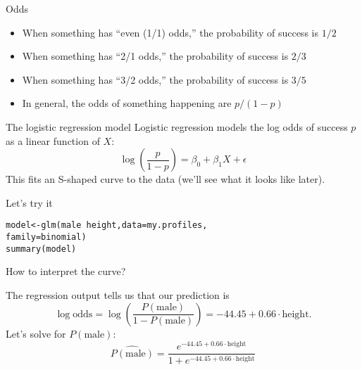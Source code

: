\documentclass{beamer}\usepackage[]{graphicx}\usepackage[]{color}
\makeatletter
\newcommand{\hlopt}[1]{\textcolor[rgb]{1,0.894,0.769}{#1}}%
\newcommand{\hlstd}[1]{\textcolor[rgb]{1,0.894,0.769}{#1}}%
\newcommand{\hlkwb}[1]{\textcolor[rgb]{0.804,0.776,0.451}{#1}}%
\newcommand{\hlkwc}[1]{\textcolor[rgb]{0.78,0.941,0.545}{#1}}%
\newcommand{\hlkwd}[1]{\textcolor[rgb]{1,0.78,0.769}{#1}}%
\newenvironment{kframe}{%
 \def\at@end@of@kframe{}%
 \ifinner\ifhmode%
  \def\at@end@of@kframe{\end{minipage}}%
  \begin{minipage}{\columnwidth}%
 \fi\fi%
 \def\FrameCommand##1{\hskip\@totalleftmargin \hskip-\fboxsep
 \colorbox{shadecolor}{##1}\hskip-\fboxsep
     \hskip-\linewidth \hskip-\@totalleftmargin \hskip\columnwidth}%
 \MakeFramed {\advance\hsize-\width
   \@totalleftmargin\z@ \linewidth\hsize
   \@setminipage}}%
 {\par\unskip\endMakeFramed%
 \at@end@of@kframe}
\newenvironment{knitrout}{}{} %
\makeatother
\begin{document}
\begin{darkframes}
    \begin{frame}{Odds}
      \begin{itemize}[<+->]
        \item When something has ``even (1/1) odds,'' the probability of success is $1/2$
        \item When something has ``2/1 odds,'' the probability of success is $2/3$
        \item When something has ``3/2 odds,'' the probability of success is $3/5$
        \item In general, the odds of something happening are $p/(1-p)$
      \end{itemize}
    \end{frame}

    \begin{frame}{The logistic regression model}
      Logistic regression models the \alert{log odds} of success $p$ as a linear function of $X$:
      \[
        \log\left(\frac{p}{1-p}\right) = \beta_0 + \beta_1 X + \epsilon
      \]
      This fits an S-shaped curve to the data (we'll see what it looks like later).
    \end{frame}

    \begin{frame}[fragile]{Let's try it}
\begin{knitrout}
\color{fgcolor}\begin{kframe}
\begin{alltt}
\hlstd{model} \hlkwb{<-} \hlkwd{glm}\hlstd{(male} \hlopt{~} \hlstd{height,} \hlkwc{data}\hlstd{=my.profiles,}
             \hlkwc{family}\hlstd{=binomial)}
\hlkwd{summary}\hlstd{(model)}
\end{alltt}
\end{kframe}
\end{knitrout}
    \end{frame}

    \begin{frame}{How to interpret the curve?}
      
      The regression output tells us that our prediction is
      \[
        \log\text{odds} = \log\left(\frac{P(\text{male})}{1-P(\text{male})}\right) = -44.45 + 0.66\cdot\text{height}.
      \]
      \pause
      Let's solve for $P(\text{male})$:
      \[
        \widehat{P(\text{male})} = \frac{e^{-44.45 + 0.66\cdot\text{height}}}{1 + e^{-44.45 + 0.66\cdot\text{height}}}
      \]
    \end{frame}


\end{darkframes}
\end{document}
